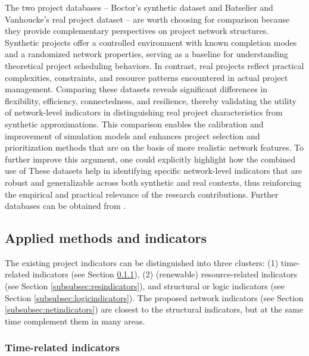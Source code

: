 \documentclass[preprint,
3p]{elsarticle} %
\begin{document}
The two project databases -- Boctor's synthetic dataset and Batselier
and Vanhoucke's real project dataset -- are worth choosing for
comparison because they provide complementary perspectives on project
network structures. Synthetic projects offer a controlled environment
with known completion modes and a randomized network properties, serving
as a baseline for understanding theoretical project scheduling
behaviors. In contrast, real projects reflect practical complexities,
constraints, and resource patterns encountered in actual project
management. Comparing these datasets reveals significant differences in
flexibility, efficiency, connectedness, and resilience, thereby
validating the utility of network-level indicators in distinguishing
real project characteristics from synthetic approximations. This
comparison enables the calibration and improvement of simulation models
and enhances project selection and prioritization methods that are on
the basis of more realistic network features. To further improve this
argument, one could explicitly highlight how the combined use of These
datasets help in identifying specific network-level indicators that are
robust and generalizable across both synthetic and real contexts, thus
reinforcing the empirical and practical relevance of the research
contributions. Further databases can be obtained from
\citet{kosztyan2024compound}.

\subsection{Applied methods and indicators}\label{subsec:methods}

The existing project indicators can be distinguished into three
clusters: (1) time-related indicators (see Section
\ref{subsubsec:timeindicators}), (2) (renewable) resource-related
indicators (see Section \ref{subsubsec:resindicators}), and structural
or logic indicators (see Section \ref{subsubsec:logicindicators}). The
proposed network indicators (see Section \ref{subsubsec:netindicators})
are closest to the structural indicators, but at the same time
complement them in many areas.

\subsubsection{Time-related indicators}\label{subsubsec:timeindicators}
\end{document}
